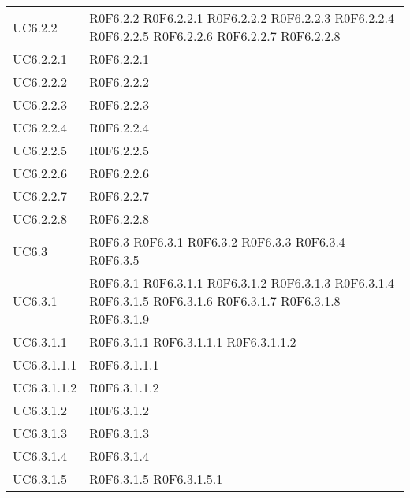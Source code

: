 \begin{longtable}{p{2.5cm}!{\VRule[1pt]}p{2.5cm}}
UC6.2.2 & R0F6.2.2
	\newline R0F6.2.2.1
	\newline R0F6.2.2.2
	\newline R0F6.2.2.3
	\newline R0F6.2.2.4
	\newline R0F6.2.2.5
	\newline R0F6.2.2.6
	\newline R0F6.2.2.7
	\newline R0F6.2.2.8\\
UC6.2.2.1 & R0F6.2.2.1\\
UC6.2.2.2 & R0F6.2.2.2\\
UC6.2.2.3 & R0F6.2.2.3\\
UC6.2.2.4 & R0F6.2.2.4\\
UC6.2.2.5 & R0F6.2.2.5\\
UC6.2.2.6 & R0F6.2.2.6\\
UC6.2.2.7 & R0F6.2.2.7\\
UC6.2.2.8 & R0F6.2.2.8\\
UC6.3 & R0F6.3
	\newline R0F6.3.1
	\newline R0F6.3.2
	\newline R0F6.3.3
	\newline R0F6.3.4
	\newline R0F6.3.5\\
UC6.3.1 & R0F6.3.1
	\newline R0F6.3.1.1
	\newline R0F6.3.1.2
	\newline R0F6.3.1.3
	\newline R0F6.3.1.4
	\newline R0F6.3.1.5
	\newline R0F6.3.1.6
	\newline R0F6.3.1.7
	\newline R0F6.3.1.8
	\newline R0F6.3.1.9\\
UC6.3.1.1 & R0F6.3.1.1
	\newline R0F6.3.1.1.1
	\newline R0F6.3.1.1.2\\
UC6.3.1.1.1 & R0F6.3.1.1.1\\
UC6.3.1.1.2 & R0F6.3.1.1.2\\
UC6.3.1.2 & R0F6.3.1.2\\
UC6.3.1.3 & R0F6.3.1.3\\
UC6.3.1.4 & R0F6.3.1.4\\
UC6.3.1.5 & R0F6.3.1.5
	\newline R0F6.3.1.5.1

\end{longtable}

